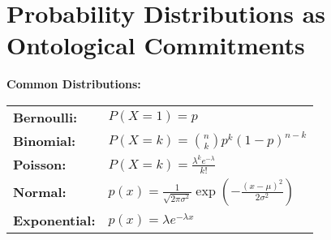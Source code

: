 \section{Probability Distributions as Ontological Commitments}

\begin{seanbox}{2.3}
	\textbf{Common Distributions:}
	
	\begin{tabular}{ll}
		\textbf{Bernoulli:} & $P(X=1) = p$ \\
		\textbf{Binomial:} & $P(X=k) = \binom{n}{k} p^k (1-p)^{n-k}$ \\
		\textbf{Poisson:} & $P(X=k) = \frac{\lambda^k e^{-\lambda}}{k!}$ \\
		\textbf{Normal:} & $p(x) = \frac{1}{\sqrt{2\pi\sigma^2}} \exp\left(-\frac{(x-\mu)^2}{2\sigma^2}\right)$ \\
		\textbf{Exponential:} & $p(x) = \lambda e^{-\lambda x}$ \\
	\end{tabular}
\end{seanbox}

